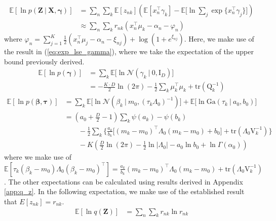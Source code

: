 \documentclass[twoside,11pt]{article}
\newcommand{\tr}{\intercal}
\newcommand{\eye}{\mathrm{I}}
\newcommand\given[1][]{\:#1\vert\:}
\newcommand{\transpose}[1]{#1^{\intercal}}
\newcommand{\nsum}{\sum\limits_{n}}
\newcommand{\ksum}{\sum\limits_{k}}
\newcommand{\boldbeta}{\boldsymbol\beta}
\newcommand{\boldgamma}{\boldsymbol\gamma}
\newcommand{\boldtau}{\boldsymbol\tau}
\newcommand{\E}{\mathbb{E}}
\newcommand{\pr}[1]{p \left( #1 \right)}
\begin{document}
\begin{equation} \label{eq:e2_deriv}
\begin{split}
	\E[\ln \pr{\mathbf{Z} \given \mathbf{X}, \boldgamma}] &= \nsum \ksum \E[z_{nk}] \left( \E[\transpose{x_n} \gamma_k] - \E\Big[\ln \sum_{j} \exp \{ \transpose{x_n}\gamma_j\}\Big]\right)\\
	&\approx \nsum \ksum r_{nk} \left( \transpose{x_n}\mu_k - \alpha_n - \varphi_n \right)
\end{split}
\end{equation}
where $\varphi_n = \sum\limits_{j=1}^K \frac{1}{2}\left(x_n^{\tr}\mu_j - \alpha_n - \xi_{nj}\right) + \log( 1 + e^{\xi_{nj}}).$
Here, we make use of the result in (\ref{eq:exp_lse_gamma}), where we take the expectation of the upper bound previously derived. 
\begin{equation} \label{eq:e3_deriv}
\begin{split}
	\E[\ln \pr{\boldgamma}] &= \ksum \E \Big[ \ln \mathcal{N}\left( \gamma_k \given 0, \eye_D\right)\Big] \\
	&= -\frac{K \cdot D}{2} \ln (2\pi) - \frac{1}{2} \ksum \transpose{\mu_k}\mu_k + \mathrm{tr} \left( \mathrm{Q}_k^{-1} \right)
\end{split}
\end{equation}
\begin{equation} \label{eq:e4_deriv} %
\begin{split}
	\E[\ln \pr{\boldbeta, \boldtau}] &= \ksum \E\Big[\ln \mathcal{N}\left( \beta_k \given m_0, \left(\tau_k \Lambda_0 \right)^{-1} \right)\Big] + \E\Big[\ln \mathrm{Ga}\left( \tau_k \given a_0, b_0\right)\Big]\\
	&= \left( a_0 + \frac{D}{2} - 1 \right) \ksum \psi(a_k) - \psi(b_k)  \\
	& \qquad - \frac{1}{2}\ksum \Bigg\{ \frac{a_k}{b_k}\Big[\transpose{(m_k - m_0)} \Lambda_0 (m_k - m_0) + b_0 \Big] + \mathrm{tr} \left( \Lambda_0 \mathrm{V}_{k}^{-1}\right) \Bigg\} \\
	& \qquad - K \left(\frac{D}{2}\ln(2\pi)  - \frac{1}{2}\ln |\Lambda_0| - a_0 \ln b_0 + \ln \Gamma(\alpha_0) \right)
\end{split}
\end{equation}
where we make use of $\E[\tau_k\transpose{(\beta_k - m_0) \Lambda_0 (\beta_k - m_0)}] =  \frac{a_k}{b_k} \transpose{(m_k - m_0)} \Lambda_0 (m_k - m_0) + \mathrm{tr} \left( \Lambda_0 \mathrm{V}_{k}^{-1}\right)$. The other expectations can be calculated using results derived in Appendix \ref{app:q_z}. In the following expectation, we make use of the established result that $E[z_{nk}] = r_{nk}$. 
\begin{equation} \label{eq:e5_deriv}
\begin{split}
	\E[\ln q(\mathbf{Z})] &=  \nsum \ksum r_{nk} \ln r_{nk}
\end{split}
\end{equation}
\end{document}
